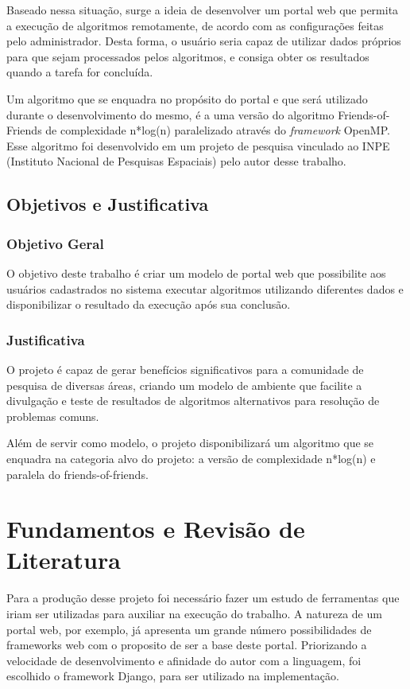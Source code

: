 \documentclass[tg]{mdtufsm}
\begin{document}
Baseado nessa situação, surge a ideia de desenvolver um portal web que permita a execução de algoritmos remotamente, de acordo com as configurações feitas pelo administrador. Desta forma, o usuário seria capaz de utilizar dados próprios para que sejam processados pelos algoritmos, e consiga obter os resultados quando a tarefa for concluída.

Um algoritmo que se enquadra no propósito do portal e que será utilizado durante o desenvolvimento do mesmo, é a uma versão do algoritmo Friends-of-Friends de complexidade n*log(n) paralelizado através do \emph{framework} OpenMP. Esse algoritmo foi desenvolvido em um projeto de pesquisa vinculado ao INPE (Instituto Nacional de Pesquisas Espaciais) pelo autor desse trabalho.

\section{Objetivos e Justificativa}

\subsection{Objetivo Geral}

O objetivo deste trabalho é criar um modelo de portal web que possibilite aos usuários cadastrados no sistema executar algoritmos utilizando diferentes dados e disponibilizar o resultado da execução após sua conclusão.

\subsection{Justificativa}

O projeto é capaz de gerar benefícios significativos para a comunidade de pesquisa de diversas áreas, criando um modelo de ambiente que facilite a divulgação e teste de resultados de algoritmos alternativos para resolução de problemas comuns.

Além de servir como modelo, o projeto disponibilizará um algoritmo que se enquadra na categoria alvo do projeto: a versão de complexidade n*log(n) e paralela do friends-of-friends.



\chapter{Fundamentos e Revisão de Literatura}
Para a produção desse projeto foi necessário fazer um estudo de ferramentas que iriam ser utilizadas para auxiliar na execução do trabalho. A natureza de um portal web, por exemplo, já apresenta um grande número possibilidades de frameworks web com o proposito de ser a base deste portal. Priorizando a velocidade de desenvolvimento e afinidade do autor com a linguagem, foi escolhido o framework Django, para ser utilizado na implementação.
\end{document}
